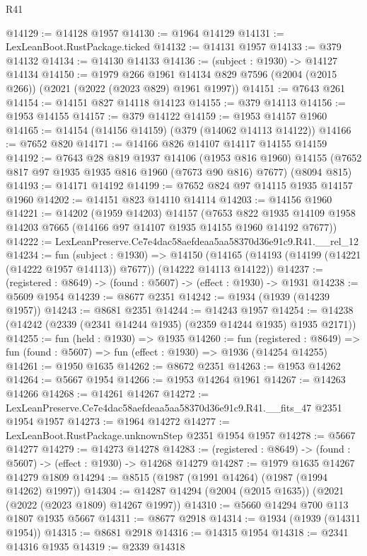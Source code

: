 \begin{lexlean}{R41}
\begin{coremodule}
@14129 := @14128 @1957
@14130 := @1964 @14129
@14131 := LexLeanBoot.RustPackage.ticked
@14132 := @14131 @1957
@14133 := @379 @14132
@14134 := @14130 @14133
@14136 := (subject : @1930) -> @14127 @14134
@14150 := @1979
    @266
    @1961
    @14134
    @829
    @7596
    (@2004 (@2015 @266))
    (@2021 (@2022 (@2023 @829) @1961 @1997))
@14151 := @7643 @261
@14154 := @14151 @827 @14118 @14123
@14155 := @379 @14113
@14156 := @1953 @14155
@14157 := @379 @14122
@14159 := @1953 @14157 @1960
@14165 := @14154 (@14156 @14159) (@379 (@14062 @14113 @14122))
@14166 := @7652 @820
@14171 := @14166 @826 @14107 @14117 @14155 @14159
@14192 := @7643
    @28
    @819
    @1937
    @14106
    (@1953 @816 @1960)
    @14155
    (@7652 @817 @97 @1935 @1935 @816 @1960 (@7673 @90 @816) @7677)
    (@8094 @815)
@14193 := @14171 @14192
@14199 := @7652 @824 @97 @14115 @1935 @14157 @1960
@14202 := @14151 @823 @14110 @14114
@14203 := @14156 @1960
@14221 := @14202
    (@1959 @14203)
    @14157
    (@7653 @822 @1935 @14109 @1958 @14203 @7665 (@14166 @97 @14107 @1935 @14155 @1960 @14192 @7677))
@14222 := LexLeanPreserve.Ce7e4dac58aefdeaa5aa58370d36e91c9.R41.__rel_12
@14234 := fun (subject : @1930) =>
  @14150 (@14165 (@14193 (@14199 (@14221 (@14222 @1957 @14113)) @7677)) (@14222 @14113 @14122))
@14237 := (registered : @8649) -> (found : @5607) -> (effect : @1930) -> @1931
@14238 := @5609 @1954
@14239 := @8677 @2351
@14242 := @1934 (@1939 (@14239 @1957))
@14243 := @8681 @2351
@14244 := @14243 @1957
@14254 := @14238 (@14242 (@2339 (@2341 @14244 @1935) (@2359 @14244 @1935) @1935 @2171))
@14255 := fun (held : @1930) => @1935
@14260 := fun (registered : @8649) =>
  fun (found : @5607) => fun (effect : @1930) => @1936 (@14254 @14255)
@14261 := @1950 @1635
@14262 := @8672 @2351
@14263 := @1953 @14262
@14264 := @5667 @1954
@14266 := @1953 @14264 @1961
@14267 := @14263 @14266
@14268 := @14261 @14267
@14272 := LexLeanPreserve.Ce7e4dac58aefdeaa5aa58370d36e91c9.R41.__fits_47 @2351 @1954 @1957
@14273 := @1964 @14272
@14277 := LexLeanBoot.RustPackage.unknownStep @2351 @1954 @1957
@14278 := @5667 @14277
@14279 := @14273 @14278
@14283 := (registered : @8649) -> (found : @5607) -> (effect : @1930) -> @14268 @14279
@14287 := @1979 @1635 @14267 @14279 @1809
@14294 := @8515 (@1987 (@1991 @14264) (@1987 (@1994 @14262) @1997))
@14304 := @14287 @14294 (@2004 (@2015 @1635)) (@2021 (@2022 (@2023 @1809) @14267 @1997))
@14310 := @5660 @14294 @700 @113 @1807 @1935 @5667
@14311 := @8677 @2918
@14314 := @1934 (@1939 (@14311 @1954))
@14315 := @8681 @2918
@14316 := @14315 @1954
@14318 := @2341 @14316 @1935
@14319 := @2339 @14318

\end{coremodule}
\end{lexlean}
